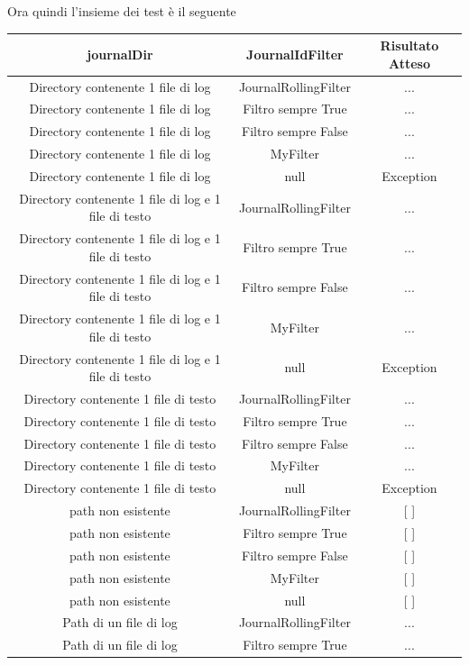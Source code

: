 \documentclass[12pt, a4paper]{article}
\begin{document}
Ora quindi l'insieme dei test è il seguente

\begin{table}[ht]
  \centering
  \begin{tabular}{|c|c|c|}
  \hline
  journalDir & JournalIdFilter & Risultato Atteso \\
  \hline
  {Directory contenente 1 file di log} & JournalRollingFilter & ... \\
  {Directory contenente 1 file di log} & Filtro sempre True & ... \\
  {Directory contenente 1 file di log} & Filtro sempre False & ... \\
  {Directory contenente 1 file di log} & MyFilter & ... \\
  {Directory contenente 1 file di log} & null & Exception \\
  {Directory contenente 1 file di log e 1 file di testo} & JournalRollingFilter & ... \\
  {Directory contenente 1 file di log e 1 file di testo} & Filtro sempre True & ... \\
  {Directory contenente 1 file di log e 1 file di testo} & Filtro sempre False & ... \\
  {Directory contenente 1 file di log e 1 file di testo} & MyFilter & ... \\
  {Directory contenente 1 file di log e 1 file di testo} & null & Exception \\
  {Directory contenente 1 file di testo} & JournalRollingFilter & ... \\
  {Directory contenente 1 file di testo} & Filtro sempre True & ... \\
  {Directory contenente 1 file di testo} & Filtro sempre False & ... \\
  {Directory contenente 1 file di testo} & MyFilter & ... \\
  {Directory contenente 1 file di testo} & null & Exception \\
  {path non esistente} & JournalRollingFilter & [ ] \\
  {path non esistente} & Filtro sempre True & [ ] \\
  {path non esistente} & Filtro sempre False & [ ] \\
  {path non esistente} & MyFilter & [ ] \\
  {path non esistente} & null & [ ] \\
  {Path di un file di log} & JournalRollingFilter & ... \\
  {Path di un file di log} & Filtro sempre True & ... \\

\end{tabular}
\end{table}
\end{document}
